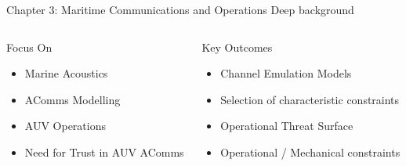 \documentclass[aspectratio=169]{beamer}
\begin{document}
\begin{frame}{Chapter 3: Maritime Communications and Operations}
  Deep background

      \begin{columns}
		\begin{column}{0.5\textwidth}
			\begin{block}{Focus On}
				\begin{itemize}
					\item Marine Acoustics
					\item AComms Modelling 
					\item AUV Operations
					\item Need for Trust in AUV AComms
				\end{itemize}
			\end{block}
		\end{column}
		\begin{column}{0.5\textwidth}
			\begin{exampleblock}{Key Outcomes}
				\begin{itemize}
					\item Channel Emulation Models
					\item Selection of characteristic constraints
					\item Operational Threat Surface
					\item Operational / Mechanical constraints
				\end{itemize}
			\end{exampleblock}
		\end{column}
      \end{columns}
      
\end{frame}
\end{document}
